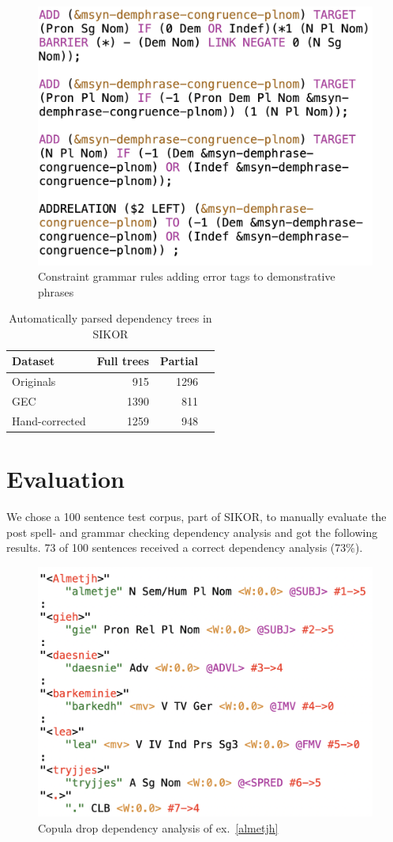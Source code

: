 \documentclass[free]{flammie}
\begin{document}
\vspace{5pt}
\begin{figure}
\includegraphics[scale=0.2]{smademphrase.jpg}
\caption{Constraint grammar rules adding error tags to demonstrative phrases\label{smademphrase}}
\end{figure}
\vspace{5pt}

\begin{table}[]
    \centering
    \begin{tabular}{lrrr}
         Dataset &  Full trees & Partial \\
         \midrule
         Originals & 915 & 1296 \\
         GEC &  1390 & 811 \\
         Hand-corrected & 1259 & 948 \\
    \end{tabular}
    \caption{Automatically parsed dependency trees in SIKOR\label{tab:my_label}}
\end{table}

\section{Evaluation}

We chose a 100 sentence test corpus, part of SIKOR, to manually evaluate the
post spell- and grammar checking dependency analysis and got the following
results.  73 of 100 sentences received a correct dependency analysis (73\%).

\begin{figure}
    \centering
    \includegraphics[width=.5\textwidth ]{copdropsma.png}
    \caption{Copula drop dependency analysis of
    ex.~\ref{almetjh}\label{copdrop}}
\end{figure}
\end{document}
